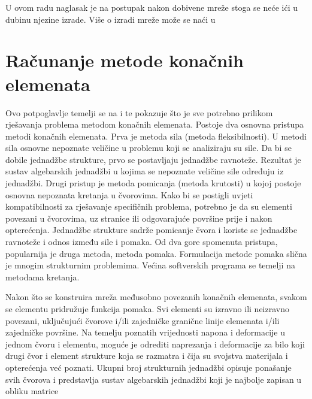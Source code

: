 \documentclass[a4paper,twoside,12pt]{memoir} %
\begin{document}
U ovom radu naglasak je na postupak nakon dobivene mreže stoga se neće ići u dubinu njezine izrade. Više o izradi mreže može se naći u \cite{tadej}

\section{Računanje metode konačnih elemenata}
Ovo potpoglavlje temelji se na \cite{jurica_soric} i \cite{fem_predavanja_bosna} te pokazuje što je sve potrebno prilikom rješavanja problema metodom konačnih elemenata.
Postoje dva osnovna pristupa metodi konačnih elemenata. 
Prva je metoda sila (metoda fleksibilnosti). U metodi sila osnovne nepoznate veličine u problemu koji se analiziraju su sile. Da bi se dobile jednadžbe strukture, prvo se postavljaju jednadžbe ravnoteže. Rezultat je sustav algebarskih jednadžbi u kojima se nepoznate veličine sile određuju iz jednadžbi.
Drugi pristup je metoda pomicanja (metoda krutosti) u kojoj postoje osnovna nepoznata kretanja u čvorovima. Kako bi se postigli uvjeti kompatibilnosti za rješavanje specifičnih problema, potrebno je da su elementi povezani u čvorovima, uz stranice ili odgovarajuće površine prije i nakon opterećenja. Jednadžbe strukture sadrže pomicanje čvora i koriste se jednadžbe ravnoteže i odnos između sile i pomaka. 
Od dva gore spomenuta pristupa, popularnija je druga metoda, metoda pomaka. Formulacija metode pomaka slična je mnogim strukturnim problemima. Većina softverskih programa se temelji na metodama kretanja. \par

Nakon što se konstruira mreža međusobno povezanih konačnih elemenata, svakom se elementu pridružuje funkcija pomaka. Svi elementi su izravno ili neizravno povezani, uključujući čvorove i/ili zajedničke granične linije elemenata i/ili zajedničke površine.
Na temelju poznatih vrijednosti napona i deformacije u jednom čvoru i elementu, moguće je odrediti naprezanja i deformacije za bilo koji drugi čvor i element strukture koja se razmatra i čija su svojstva materijala i opterećenja već poznati. Ukupni broj strukturnih jednadžbi opisuje ponašanje svih čvorova i predstavlja sustav algebarskih jednadžbi koji je najbolje zapisan u obliku matrice \par
\end{document}
